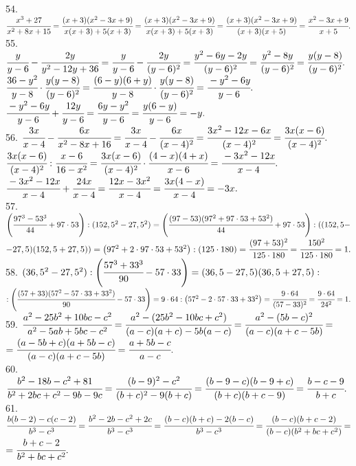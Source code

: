 \documentclass[12pt]{article}
\begin{document}
54. $\cfrac{x^3+27}{x^2+8x+15}=\cfrac{(x+3)(x^2-3x+9)}{x(x+3)+5(x+3)}=\cfrac{(x+3)(x^2-3x+9)}{x(x+3)+5(x+3)}=\cfrac{(x+3)(x^2-3x+9)}{(x+3)(x+5)}=\cfrac{x^2-3x+9}{x+5}.$\\
55. $\cfrac{y}{y-6}-\cfrac{2y}{y^2-12y+36}=\cfrac{y}{y-6}-\cfrac{2y}{(y-6)^2}=\cfrac{y^2-6y-2y}{(y-6)^2}=\cfrac{y^2-8y}{(y-6)^2}=\cfrac{y(y-8)}{(y-6)^2}.$\\
$\cfrac{36-y^2}{y-8}\cdot\cfrac{y(y-8)}{(y-6)^2}=\cfrac{(6-y)(6+y)}{y-8}\cdot\cfrac{y(y-8)}{(y-6)^2}=\cfrac{-y^2-6y}{y-6}.$\\
$\cfrac{-y^2-6y}{y-6}+\cfrac{12y}{y-6}=\cfrac{6y-y^2}{y-6}=\cfrac{y(6-y)}{y-6}=-y.$\\
56. $\cfrac{3x}{x-4}-\cfrac{6x}{x^2-8x+16}=\cfrac{3x}{x-4}-\cfrac{6x}{(x-4)^2}=\cfrac{3x^2-12x-6x}{(x-4)^2}=\cfrac{3x(x-6)}{(x-4)^2}.$\\
$\cfrac{3x(x-6)}{(x-4)^2}:\cfrac{x-6}{16-x^2}=\cfrac{3x(x-6)}{(x-4)^2}\cdot\cfrac{(4-x)(4+x)}{x-6}=\cfrac{-3x^2-12x}{x-4}.$\\
$\cfrac{-3x^2-12x}{x-4}+\cfrac{24x}{x-4}=\cfrac{12x-3x^2}{x-4}=\cfrac{3x(4-x)}{x-4}=-3x.$\\
57. $\left(\cfrac{97^3-53^3}{44}+97\cdot53\right): (152,5^2-27,5^2)=
\left(\cfrac{(97-53)(97^2+97\cdot53+53^2)}{44}+97\cdot53\right):((152,5-$\\$-27,5)(152,5+27,5))=
\left(97^2+2\cdot97\cdot53+53^2\right):(125\cdot180)=\cfrac{(97+53)^2}{125\cdot180}=
\cfrac{150^2}{125\cdot180}=1.$\\
58. $(36,5^2-27,5^2): \left(\cfrac{57^3+33^3}{90}-57\cdot 33\right)=
(36,5-27,5)(36,5+27,5):$\\$:\left(\cfrac{(57+33)(57^2-57\cdot33+33^2)}{90}-57\cdot 33\right)=
9\cdot64:\left(57^2-2\cdot57\cdot33+33^2\right)=\cfrac{9\cdot64}{(57-33)^2}=\cfrac{9\cdot64}{24^2}=1.$\\
59. $\cfrac{a^2-25b^2+10bc-c^2}{a^2-5ab+5bc-c^2}=\cfrac{a^2-(25b^2-10bc+c^2)}{(a-c)(a+c)-5b(a-c)}
=\cfrac{a^2-(5b-c)^2}{(a-c)(a+c-5b)}=$\\$=\cfrac{(a-5b+c)(a+5b-c)}{(a-c)(a+c-5b)}=\cfrac{a+5b-c}{a-c}.$\\
60. $\cfrac{b^2-18b-c^2+81}{b^2+2bc+c^2-9b-9c}=\cfrac{(b-9)^2-c^2}{(b+c)^2-9(b+c)}=\cfrac{(b-9-c)(b-9+c)}{(b+c)(b+c-9)}=\cfrac{b-c-9}{b+c}.$\\
61. $\cfrac{b(b-2)-c(c-2)}{b^3-c^3}=\cfrac{b^2-2b-c^2+2c}{b^3-c^3}=\cfrac{(b-c)(b+c)-2(b-c)}{b^3-c^3}=\cfrac{(b-c)(b+c-2)}{(b-c)(b^2+bc+c^2)}=$\\$=\cfrac{b+c-2}{b^2+bc+c^2}.$\\
\end{document}
